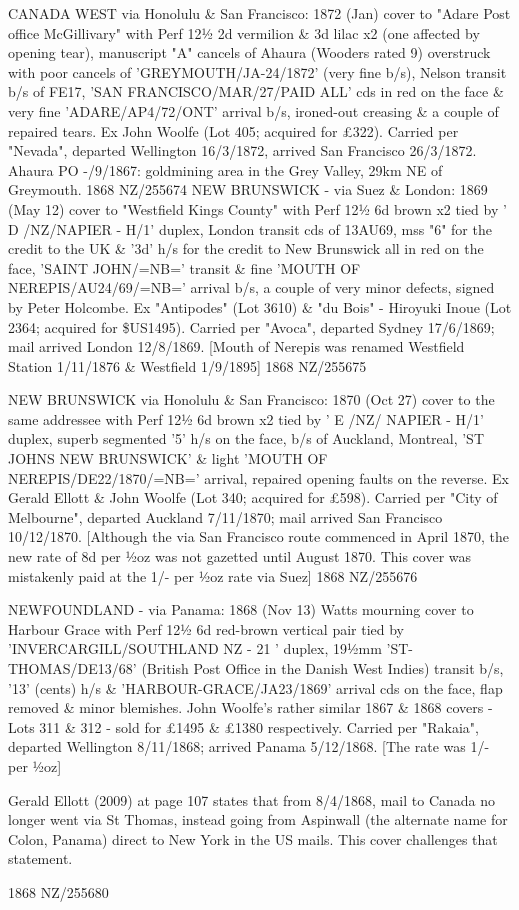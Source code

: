 \documentclass[justified]{tufte-book}
\begin{document}
%
{CANADA WEST via Honolulu \& San Francisco: 1872 (Jan) cover to "Adare Post office McGillivary" with Perf 12½ 2d vermilion \& 3d lilac x2 (one affected by opening tear), manuscript "A" cancels of Ahaura (Wooders rated 9) overstruck with poor cancels of 'GREYMOUTH/JA-24/1872' (very fine b/s), Nelson transit b/s of FE17, 'SAN FRANCISCO/MAR/27/PAID ALL' cds in red on the face \& very fine 'ADARE/AP4/72/ONT' arrival b/s, ironed-out creasing \& a couple of repaired tears. Ex John Woolfe (Lot 405; acquired for £322). Carried per "Nevada", departed Wellington 16/3/1872, arrived San Francisco 26/3/1872. Ahaura PO -/9/1867: goldmining area in the Grey Valley, 29km NE of Greymouth.}%
{1868}%
{NZ/255674}%
{}%
{}
{}%
{}
%
{NEW BRUNSWICK - via Suez \& London: 1869 (May 12) cover to "Westfield Kings County" with Perf 12½ 6d brown x2 tied by ' D /NZ/NAPIER - H/1' duplex, London transit cds of 13AU69, mss "6" for the credit to the UK \& '3d' h/s for the credit to New Brunswick all in red on the face, 'SAINT JOHN/=NB=' transit \& fine 'MOUTH OF NEREPIS/AU24/69/=NB=' arrival b/s, a couple of very minor defects, signed by Peter Holcombe. Ex "Antipodes" (Lot 3610) \& "du Bois" - Hiroyuki Inoue (Lot 2364; acquired for \$US1495). Carried per "Avoca", departed Sydney 17/6/1869; mail arrived London 12/8/1869. [Mouth of Nerepis was renamed Westfield Station 1/11/1876 \& Westfield 1/9/1895]}%
{1868}%
{NZ/255675}%
{}%
{}
{}%
{}

%
{NEW BRUNSWICK via Honolulu \& San Francisco: 1870 (Oct 27) cover to the same addressee with Perf 12½ 6d brown x2 tied by ' E /NZ/ NAPIER - H/1' duplex, superb segmented '5' h/s on the face, b/s of Auckland, Montreal, 'ST JOHNS NEW BRUNSWICK' \& light 'MOUTH OF NEREPIS/DE22/1870/=NB=' arrival, repaired opening faults on the reverse. Ex Gerald Ellott \& John Woolfe (Lot 340; acquired for £598). Carried per "City of Melbourne", departed Auckland 7/11/1870; mail arrived San Francisco 10/12/1870. [Although the via San Francisco route commenced in April 1870, the new rate of 8d per ½oz was not gazetted until August 1870. This cover was mistakenly paid at the 1/- per ½oz rate via Suez]}%
{1868}%
{NZ/255676}%
{}%
{}
{}%
{}

%
{NEWFOUNDLAND - via Panama: 1868 (Nov 13) Watts mourning cover to Harbour Grace with Perf 12½ 6d red-brown vertical pair tied by 'INVERCARGILL/SOUTHLAND NZ - 21 ' duplex, 19½mm 'ST-THOMAS/DE13/68' (British Post Office in the Danish West Indies) transit b/s, '13' (cents) h/s \& 'HARBOUR-GRACE/JA23/1869' arrival cds on the face, flap removed \& minor blemishes. John Woolfe's rather similar 1867 \& 1868 covers - Lots 311 \& 312 - sold for £1495 \& £1380 respectively. Carried per "Rakaia", departed Wellington 8/11/1868; arrived Panama 5/12/1868. [The rate was 1/- per ½oz]

Gerald Ellott (2009) at page 107 states that from 8/4/1868, mail to Canada no longer went via St Thomas, instead going from Aspinwall (the alternate name for Colon, Panama) direct to New York in the US mails. This cover challenges that statement.}%
{1868}%
{NZ/255680}%
{}%
{}
{}%
{}
\end{document}
